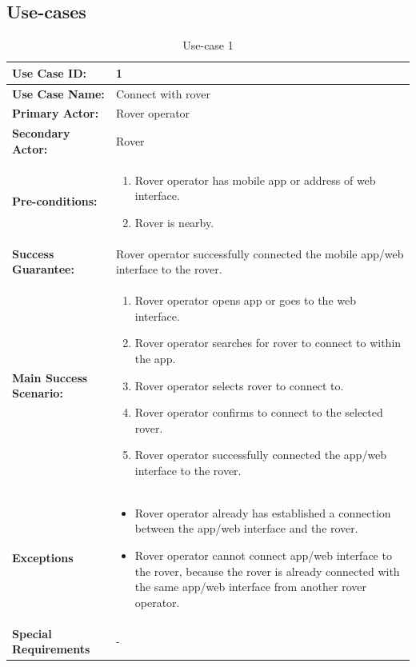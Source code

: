 \documentclass[12pt]{article}
\begin{document}
 	\subsection{Use-cases}
	 	\begin{table}[H]
	 	\centering
		 	\begin{tabularx}{\linewidth}{|X|X|}
		 		\hline
		 		\textbf{Use Case ID:} &1\\
		 		\hline
		 		\textbf{Use Case Name:} &Connect with rover\\
		 		\hline
		 		\textbf{Primary Actor:} &Rover operator\\
		 		\hline
		 		\textbf{Secondary Actor:} &Rover\\
		 		\hline
		 		\textbf{Pre-conditions:} &\begin{enumerate}
		 			\item Rover operator has mobile app or address of web interface.
		 			\item Rover is nearby.
		 		\end{enumerate}\\
		 		\hline
		 		\textbf{Success Guarantee:} &Rover operator successfully connected the mobile app/web interface to the rover. \\
		 		\hline 
		 		\textbf{Main Success Scenario:} &\begin{enumerate}
		 			\item Rover operator opens app or goes to the web interface.
		 			\item Rover operator searches for rover to connect to within the app.
		 			\item Rover operator selects rover to connect to.
		 			\item Rover operator confirms to connect to the selected rover.
		 			\item Rover operator successfully connected the app/web interface to the rover.
		 		\end{enumerate}\\
		 		\hline
		 		\textbf{Exceptions} &\begin{itemize}
		 			\item Rover operator already has established a connection between the app/web interface and the rover.
		 			\item Rover operator cannot connect app/web interface to the rover, because the rover is already connected with the same app/web interface from another rover operator.
		 			
		 		\end{itemize}\\
		 		\hline
		 		\textbf{Special Requirements} &- \\
		 		\hline
		 	\end{tabularx}
		 	\caption{Use-case 1}
		 	\label{table:Use-case1}   
	 	\end{table}
\end{document}
